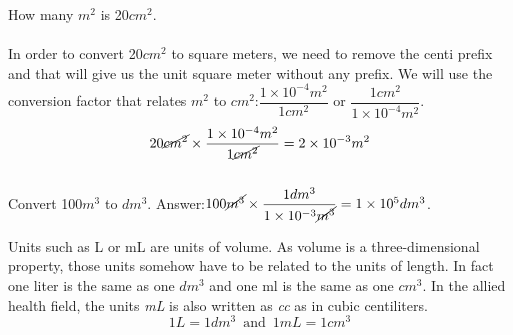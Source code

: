 \documentclass[main.tex]{subfiles}
\begin{document}
\begin{description}
\begin{example} %
How many $m^2$ is 20$cm^2$.\\
\\
In order to convert 20$cm^2$ to square meters, we need to remove the centi prefix and that will give us the unit square meter without any prefix. We will use the conversion factor that relates $m^2$ to $cm^2$:$\dfrac{1\times10^{-4}m^2}{1cm^2}$ or $\dfrac{1cm^2}{1\times10^{-4}m^2}$. 
 \begin{equation*}
20\cancel{cm^2} \times \dfrac{1\times10^{-4}m^2}{1\cancel{cm^2}}=2\times 10^{-3}m^2
\end{equation*}
\faDiamond\ \\
Convert 100$m^3$ to $dm^3$.
\flushright Answer:$100\cancel{m^3} \times \dfrac{1dm^3}{1\times10^{-3}\cancel{m^3}}=1\times 10^5dm^3$.
\end{example}%



%
%










\item[\docfilehook{Units of volume}{Units of volume}] Units such as L or mL are units of volume. As volume is a three-dimensional property, those units somehow have to be related to the units of length. In fact one liter is the same as one $dm^3$ and one ml is the same as one $cm^3$. In the allied health field, the units \emph{mL} is also written as \emph{cc} as in cubic centiliters.
\begin{equation*}
\boxed{   1L=1dm^3 \enspace \text{and}  \enspace1mL=1cm^3}   
\end{equation*}


\end{description}
\end{document}
